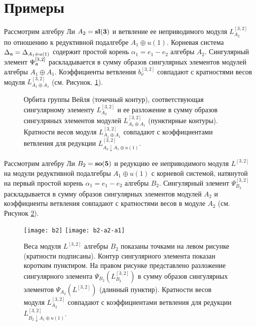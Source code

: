 \section{Примеры}
\label{sec:examples}
\begin{example}
\label{example-1}
Рассмотрим алгебру Ли $A_{2} =\bf{sl}(3)$ и ветвление ее неприводимого модуля $L^{[3,2]}_{A_{2}}$ по отношению к редуктивной подалгебре $A_{1}\oplus u(1)$. Корневая система  $\Delta _{\mathfrak{a}}= \Delta_{A_{1}\oplus u(1)}$ содержит простой корень $\alpha_1=e_1-e_2$ алгебры $A_{2}$. Сингулярный элемент $\Psi^{[3,2]}_{\mathfrak{a}}$ раскладывается в сумму образов сингулярных элементов  модулей алгебры $A_{1}\oplus A_{1}$. Коэффициенты ветвления $b_{\nu }^{[ 3,2 ] }$ совпадают с кратностями весов модуля $L^{[3,2]}_{A_{1}\oplus A_{1}}$ (см. Рисунок. \ref{fig:a2_splint}).

  \begin{figure}[h!bt]
  \noindent\centering{
   \texttt{[image: a2-a1]}
  }
  \caption{Орбита группы Вейля (точечный контур), соответствующая сингулярному элементу $L^{[3,2]}_{A_{2}}$ и ее разложение в сумму образов сингулряных элементов модулей  $L^{[3,2]}_{A_{1}\oplus A_{1}}$ (пунктирные контуры). Кратности весов модуля $L^{[3,2]}_{A_{1}\oplus A_{1}}$ совпадают  с коэффициентами ветвления для редукции $L^{[3,2]}_{A_{2}\downarrow A_{1}\oplus u(1)}$.}

 \label{fig:a2_splint}
\end{figure}
\end{example}
\begin{example}
\label{example-2}
 Рассмотрим алгебру Ли $B_{2}= \bf{so}(5)$ и редукцию ее неприводимого модуля  $L^{[3,2]}$ на модули редуктивной подалгебры  $A_{1}\oplus u(1)$ с корневой системой, натянутой на первый простой корень $\alpha_1=e_1-e_2$ алгебры $B_{2}$. Сингулярный элемент $\Psi^{[3,2]}_{B_{2}}$ раскладывается в сумму образов сингулярных элементов модулей $A_{2}$ и коэффициенты ветвления совпадают с кратностями весов в модуле $A_{2}$ (см. Рисунок \ref{fig:b2_splint}).

  \begin{figure}[h!bt]
  \hspace*{-1.2cm}

   \texttt{[image: b2]}
   \texttt{[image: b2-a2-a1]}
  \caption{Веса модуля  $L^{[3,2]}$ алгебры  $B_{2}$ показаны точками на левом рисунке (кратности подписаны). Контур сингулярного элемента показан коротким пунктиром. На правом рисунке представлено разложение сингулярного элемента $\Psi_{B_{2}}(L^{[3,2]}_{B_{2}})$ в сумму образов сингулярных элементов $\Psi_{A_{2}}(L^{[3,2]})$ (длинный пунктир). Кратности весов модуля $L^{[3,2]}_{A_{2}}$ совпадают с коэффициентами ветвления для редукции $L^{[3,2]}_{B_{2}\downarrow A_{1}\oplus u(1)}$.}

 \label{fig:b2_splint}
\end{figure}
\end{example}

